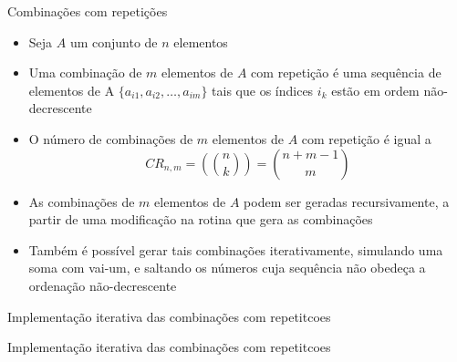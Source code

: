 \begin{frame}[fragile]{Combinações com repetições}

    \begin{itemize}
        \item Seja $A$ um conjunto de $n$ elementos

        \item Uma combinação de $m$ elementos de $A$ com repetição é uma sequência de elementos 
            de A $\lbrace a_{i1}, a_{i2}, \ldots, a_{im}\rbrace$ tais que os índices $i_k$ estão
            em ordem não-decrescente

        \item O número de combinações de $m$ elementos de $A$ com repetição é igual a 
        \[
            CR_{n,m} =\left(\!\!\!\binom{n}{k}\!\!\!\right) = \binom{n + m - 1}{m}
        \]

        \item As combinações de $m$ elementos de $A$ podem ser geradas recursivamente, a
            partir de uma modificação na rotina que gera as combinações

        \item Também é possível gerar tais combinações iterativamente, simulando uma soma
            com vai-um, e saltando os números cuja sequência não obedeça a ordenação
            não-decrescente
 
    \end{itemize}

\end{frame}

\begin{frame}[fragile]{Implementação iterativa das combinações com repetitcoes}
\end{frame}

\begin{frame}[fragile]{Implementação iterativa das combinações com repetitcoes}
\end{frame}





